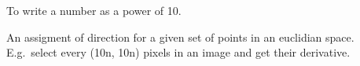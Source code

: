\begin{definition}
    To write a number as a power of 10.
\end{definition}

\begin{definition}\label{vectorfield}
    An assigment of direction for a given set of points in an euclidian space.
    E.g.\ select every (10n, 10n) pixels in an image and get their derivative.
\end{definition}

